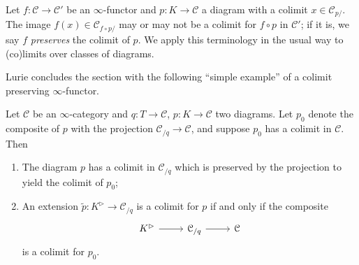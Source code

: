 Let $f : \mathcal{C}  \to \mathcal{C} '$ be an $\infty $-functor and $p : K \to \mathcal{C} $ a diagram with a colimit $x\in \mathcal{C} _{p/} $. The image $f(x)\in \mathcal{C} _{f\circ p/} $ may or may not be a colimit for $f\circ p$ in $\mathcal{C} '$; if it is, we say $f$ \emph{preserves} the colimit of $p$. We apply this terminology in the usual way to (co)limits over classes of diagrams.

Lurie concludes the section with the following ``simple example'' of a colimit preserving $\infty $-functor.

\begin{proposition}\label{1.2.13.3}
	Let $\mathcal{C} $ be an $\infty $-category and $q : T \to \mathcal{C} $, $p : K \to \mathcal{C} $ two diagrams. Let $p_0$ denote the composite of $p$ with the projection $\mathcal{C} _{/q} \to \mathcal{C} $, and suppose $p_0$ has a colimit in $\mathcal{C} $. Then
	\begin{enumerate}
		\item The diagram $p$ has a colimit in $\mathcal{C} _{/q} $ which is preserved by the projection to yield the colimit of $p_0$;
		\item An extension $\widetilde{p} : K^{\rhd}  \to \mathcal{C} _{/q} $ is a colimit for $p$ if and only if the composite
			\[\begin{tikzcd}[row sep = 2.5em, column sep = 2.5em]
			K^{\rhd} \ar[r]  & \mathcal{C} _{/q} \ar[r]  & \mathcal{C} 
			\end{tikzcd}\]
			is a colimit for $p_0$.
	\end{enumerate}
\end{proposition}
